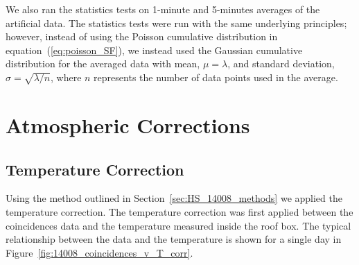 We also ran the statistics tests on 1-minute and 5-minutes averages of the artificial data. The statistics tests were run with the same underlying principles; however, instead of using the Poisson cumulative distribution in equation~(\ref{eq:poisson_SF}), we instead used the Gaussian cumulative distribution for the averaged data with mean, $\mu = \lambda$, and standard deviation, $\sigma = \sqrt{\lambda/n}$, where $n$ represents the number of data points used in the average. %



\section{Atmospheric Corrections}\label{sec:HS_14008_atmospheric_correction}


\subsection{Temperature Correction}\label{sec:HS_14008_T_corr}

Using the method outlined in Section~\ref{sec:HS_14008_methods} we applied the temperature correction. The temperature correction was first applied between the coincidences data and the temperature measured inside the roof box. The typical relationship between the data and the temperature is shown for a single day in Figure~\ref{fig:14008_coincidences_v_T_corr}.

